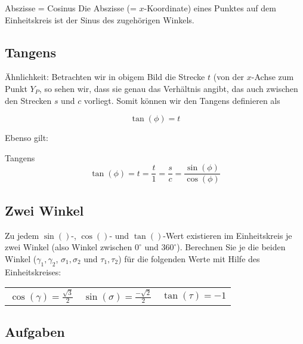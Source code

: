 \begin{bemerkung}{Abszisse = Cosinus}{}
  Die Abszisse (= $x$-Koordinate) eines Punktes auf dem Einheitskreis ist
  der Sinus des zugehörigen Winkels.
\end{bemerkung}

\newpage
\subsection{Tangens}

\einheitskreis{}
Ähnlichkeit: 
Betrachten wir in obigem Bild die Strecke $t$ (von der $x$-Achse zum
Punkt $Y_P$, so sehen wir, dass sie genau das Verhältnis angibt, das
auch zwischen den Strecken $s$ und $c$ vorliegt. 
Somit können wir den Tangens definieren als

$$\tan(\phi) = t$$

Ebenso gilt:
\begin{gesetz}{Tangens}{}
$$\tan(\phi) = t = \frac{t}{1} =  \frac{s}{c} = \frac{\sin(\phi)}{\cos(\phi)}$$
\end{gesetz}


\subsection{Zwei Winkel}
Zu jedem $\sin()$-, $\cos()$- und $\tan()$-Wert existieren im
Einheitskreis je zwei Winkel (also Winkel zwischen $0^{\circ{}}$ und
$360^{\circ{}}$). Berechnen Sie je die beiden Winkel ($\gamma_1, \gamma_2$,
$\sigma_1, \sigma_2$ und $\tau_1, \tau_2$) für die folgenden Werte mit Hilfe des
Einheitskreises:


\begin{tabular}{|c|c|c|}
  $\cos(\gamma)=\frac{\sqrt{3}}{2}$ & $\sin(\sigma) = \frac{-\sqrt{2}}{2}$ & $\tan(\tau) = -1$\\
\end{tabular}

\newpage


\subsection*{Aufgaben}


\newpage
